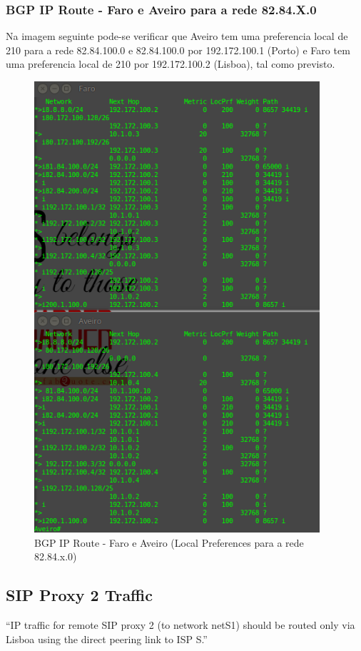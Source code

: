 \documentclass[11pt,a4paper]{report}
\begin{document}
\subsubsection{BGP IP Route - Faro e Aveiro para a rede 82.84.X.0}

Na imagem seguinte pode-se verificar que Aveiro tem uma preferencia local de 210 para a rede 82.84.100.0 e 82.84.100.0 por 192.172.100.1 (Porto) e Faro tem uma preferencia local de 210 por 192.172.100.2 (Lisboa), tal como previsto.

\begin{figure}[H]
\centerline{\includegraphics[width=300pt]{Selection_001.png}}
\caption{BGP IP Route - Faro e Aveiro (Local Preferences para a rede 82.84.x.0)}
\label{schema}
\end{figure}

\subsection{SIP Proxy 2 Traffic}

``IP traffic for remote SIP proxy 2 (to network netS1) should be routed only via Lisboa using the direct peering link to ISP S.''
\newline
\end{document}
